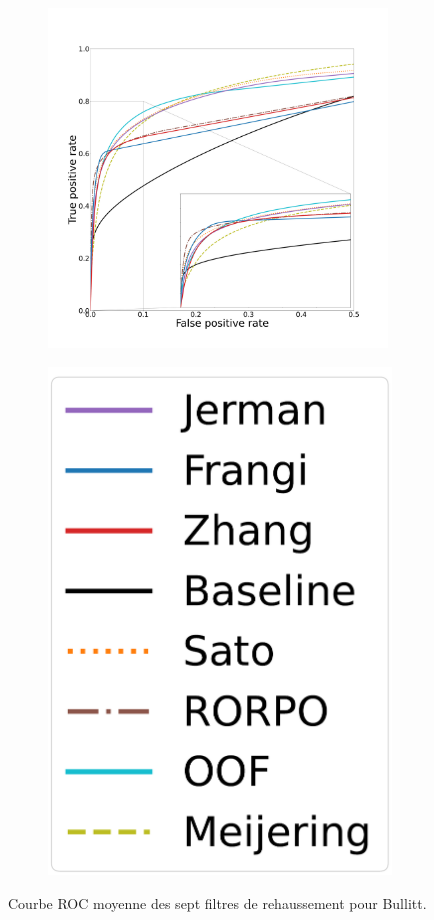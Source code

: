 \begin{figure}[!ht]
  \centering
  \begin{subfigure}[t]{0.78\textwidth}
    \centering
  \includegraphics[clip = true, trim  =  125 125 180 200, height=9cm]{Images/Bullitt_ROC.pdf}
  \end{subfigure}
  \begin{subfigure}[t]{0.2\textwidth}
    \includegraphics[width=\textwidth,clip = true]{Images/standAloneLegend.pdf}
  \end{subfigure}
  \caption{Courbe ROC moyenne des sept filtres de rehaussement pour Bullitt.}
\end{figure}
